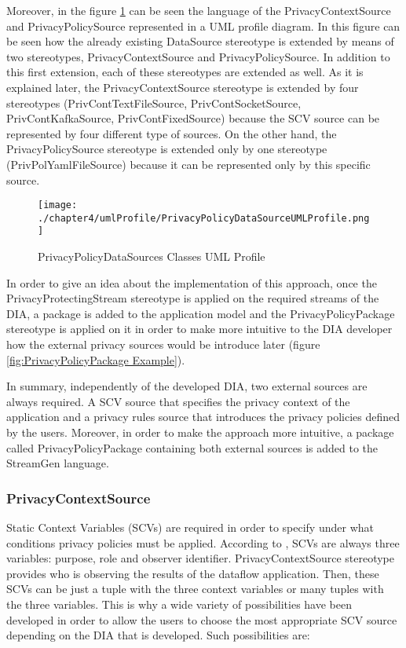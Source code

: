 Moreover, in the figure \ref{fig:PrivacyPolicyDataSources Classes UML Profile} can be seen the language of the PrivacyContextSource and PrivacyPolicySource represented in a UML profile diagram. In this figure can be seen how the already existing DataSource stereotype is extended by means of two stereotypes, PrivacyContextSource and PrivacyPolicySource. In addition to this first extension, each of these stereotypes are extended as well. As it is explained later, the PrivacyContextSource stereotype is extended by four stereotypes (PrivContTextFileSource, PrivContSocketSource, PrivContKafkaSource, PrivContFixedSource) because the SCV source can be represented by four different type of sources. On the other hand, the PrivacyPolicySource stereotype is extended only by one stereotype (PrivPolYamlFileSource) because it can be represented only by this specific source.

\begin{figure}
\centering
{\texttt{[image: ./chapter4/umlProfile/PrivacyPolicyDataSourceUMLProfile.png]}}
\caption{PrivacyPolicyDataSources Classes UML Profile}
\label{fig:PrivacyPolicyDataSources Classes UML Profile}
\end{figure}

In order to give an idea about the implementation of this approach, once the PrivacyProtectingStream stereotype is applied on the required streams of the DIA, a package is added to the application model and the PrivacyPolicyPackage stereotype is applied on it in order to make more intuitive to the DIA developer how the external privacy sources would be introduce later (figure \ref{fig:PrivacyPolicyPackage Example}).

In summary, independently of the developed DIA, two external sources are always required. A SCV source that specifies the privacy context of the application and a privacy rules source that introduces the privacy policies defined by the users. Moreover, in order to make the approach more intuitive, a package called PrivacyPolicyPackage containing both external sources is added to the StreamGen language.

\subsubsection{PrivacyContextSource}

Static Context Variables (SCVs) are required in order to specify under what conditions privacy policies must be applied. According to \cite{privacypoliciesarticle}, SCVs are always three variables: purpose, role and observer identifier. PrivacyContextSource stereotype provides who is observing the results of the dataflow application. Then, these SCVs can be just a tuple with the three context variables or many tuples with the three variables. This is why a wide variety of possibilities have been developed in order to allow the users to choose the most appropriate SCV source depending on the DIA that is developed. Such possibilities are:

